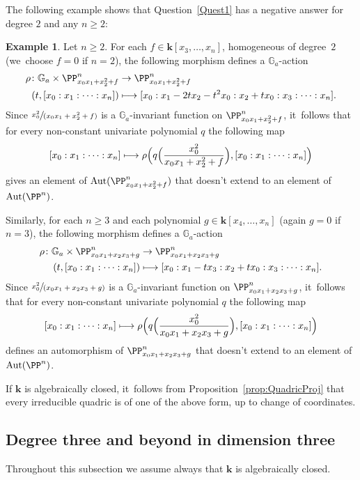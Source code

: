 \documentclass[JEP,XML,SOM,Unicode,NoFloatCountersInSection,published]{cedram}
\newcommand\mto{\mathchoice{\longmapsto}{\mapsto}{\mapsto}{\mapsto}}
\newcommand{\spfrac}[2]{\sfrac{#1}{(#2)}}
\theoremstyle{definition}
\newtheorem{example}[lemma]{Example}
\renewcommand\k{{\mathbf k}}
\newcommand\GG{{\mathbb G}}
\newcommand{\kk}{\mathbf{k}}
\DeclareMathOperator{\Aut}{Aut}
\begin{document}
The following example shows that Question~\eqref{Quest1} has a negative answer for degree $2$ and any $n \geq 2$:
\begin{example}
\label{Exa.Counterexample_Q1deg2}
Let $n \geq 2$. For each $f\in \k[x_3,\ldots,x_{n}]$, homogeneous of degree~$2$ (we~choose $f=0$ if $n=2$),
the following morphism defines a $\GG_a$-action
\begin{align*}
\rho \colon \GG_a \times \PP^n_{x_0x_1+x_2^2+f} &\to \PP^n_{x_0x_1+x_2^2+f} \\
(t, [x_0:x_1: \cdots: x_n]) &\mto [x_0: x_1 -2tx_2 - t^2x_0: x_2 + tx_0: x_3:\cdots:x_{n}].
\end{align*}
Since $\spfrac{x_0^2}{x_0x_1+x_2^2+f}$ is a $\GG_a$-invariant function on $\PP^n_{x_0x_1+x_2^2+f}$,
it~follows that for every non-constant univariate polynomial $q$ the following
map
\[
[x_0:x_1: \cdots: x_n] \mto \rho \Bigl(q\Bigl(\frac{x_0^2}{x_0x_1+x_2^2+f}\Bigr),
[x_0:x_1: \cdots: x_n] \Bigr)
\]
gives an element of $\Aut(\PP^n_{x_0x_1+x_2^2+f})$ that doesn't extend to an element of $\Aut(\PP^n)$.

Similarly, for each $n\ge 3$ and each polynomial $g\in \k[x_4,\ldots,x_n]$ (again $g=0$ if~$n=3$),
the following morphism defines a $\GG_a$-action
\begin{align*}
\rho \colon \GG_a \times \PP^n_{x_0x_1+x_2x_3+g} &\to\PP^n_{x_0x_1+x_2x_3+g} \\
(t, [x_0:x_1: \cdots: x_n]) &\mto [x_0:x_1-tx_3: x_2+tx_0:x_3:\cdots: x_n].
\end{align*}
Since $\spfrac{x_0^2}{x_0x_1+x_2x_3+g}$ is a $\GG_a$-invariant function on $\PP^n_{x_0x_1+x_2x_3+g}$,
it~follows that for every non-constant univariate polynomial $q$ the following
map
\[
[x_0:x_1: \cdots: x_n] \mto \rho \Bigl(q\Bigl(\frac{x_0^2}{x_0x_1+x_2 x_3 + g}\Bigr),
[x_0:x_1: \cdots: x_n] \Bigr)
\]
defines an automorphism of $\PP^n_{x_0x_1+x_2x_3+g}$ that doesn't extend to an element of $\Aut(\PP^n)$.

If $\k$ is algebraically closed, it~follows from Proposition~\ref{prop:QuadricProj} that every irreducible quadric is of one of the above form, up to change of coordinates.
\end{example}

\subsection{Degree three and beyond in dimension three}
\label{Subsec.Degree3n3}

Throughout this subsection we assume always that $\kk$ is algebraically closed.
\end{document}
